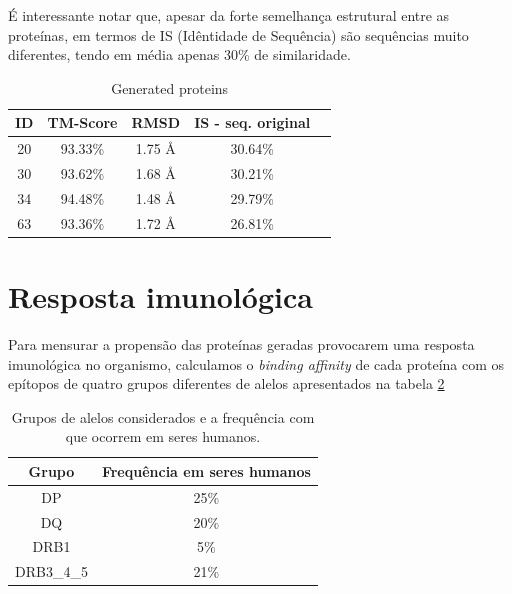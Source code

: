 É interessante notar que, apesar da forte semelhança estrutural entre as proteínas,
em termos de IS (Idêntidade de Sequência)
são sequências muito diferentes, tendo em média apenas 30\% de similaridade. 
  
\begin{table}[htbp]
    \centering
    \begin{tabular}{c|cccc}
        \hline
        \textbf{ID} & \textbf{TM-Score} & \textbf{RMSD} & \textbf{IS - seq. original} \\
        \hline
         20 & 93.33\% & 1.75 Å & 30.64\% \\
         30 & 93.62\% & 1.68 Å & 30.21\% \\
         34 & 94.48\% & 1.48 Å & 29.79\% \\
         63 & 93.36\% & 1.72 Å & 26.81\% \\
        \hline
    \end{tabular}
    \caption{Generated proteins}
    \label{tab:tabela_exemplo}
\end{table}



\section{Resposta imunológica}

Para mensurar a propensão das proteínas geradas provocarem uma resposta imunológica no organismo, 
calculamos o \textit{binding affinity} de cada proteína com os epítopos de quatro grupos diferentes 
de alelos apresentados na tabela \ref{tab:alelo_grupos}


    \begin{table}[]
        \begin{tabular}{|c|c|}
        \hline
        \rowcolor[HTML]{C0C0C0} 
        {\color[HTML]{343434} Grupo} & {\color[HTML]{343434} Frequência em seres humanos} \\ \hline
        DP                                                                         & 25\%                                                                           \\ \hline
        DQ                                                                         & 20\%                                                                           \\ \hline
        DRB1                                                                       & 5\%                                                                            \\ \hline
        DRB3\_4\_5                                                                 & 21\%                                                                           \\ \hline
        \end{tabular}
        \caption{Grupos de alelos considerados e a frequência com que ocorrem em seres humanos.}
        \label{tab:alelo_grupos}
        \end{table}


